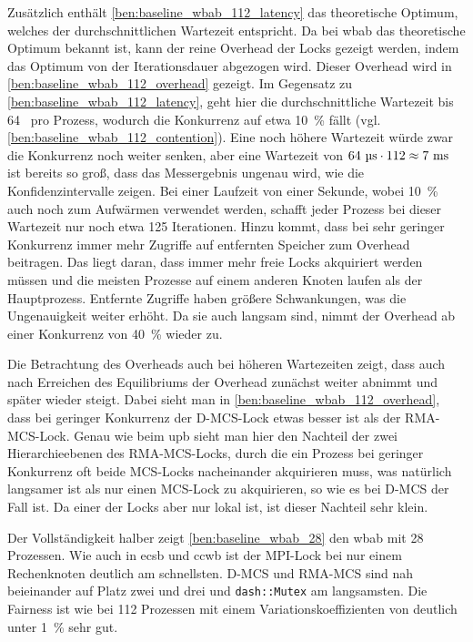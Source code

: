 Zusätzlich enthält \autoref{ben:baseline_wbab_112_latency} das theoretische Optimum,
welches der durchschnittlichen Wartezeit entspricht.
Da bei \gls{wbab} das theoretische Optimum bekannt ist,
kann der reine Overhead der Locks gezeigt werden,
indem das Optimum von der Iterationsdauer abgezogen wird.
Dieser Overhead wird in \autoref{ben:baseline_wbab_112_overhead} gezeigt.
Im Gegensatz zu \autoref{ben:baseline_wbab_112_latency},
geht hier die durchschnittliche Wartezeit bis 64~ pro Prozess,
wodurch die \gls{Konkurrenz} auf etwa 10~\% fällt
(vgl. \autoref{ben:baseline_wbab_112_contention}).
Eine noch höhere Wartezeit würde zwar die \gls{Konkurrenz} noch weiter senken,
aber eine Wartezeit von $64~\text{\textmu{s}} \cdot 112 \approx 7~\text{ms}$ ist bereits so groß,
dass das Messergebnis ungenau wird,
wie die Konfidenzintervalle zeigen.
Bei einer Laufzeit von einer Sekunde,
wobei 10~\% auch noch zum Aufwärmen verwendet werden,
schafft jeder Prozess bei dieser Wartezeit nur noch etwa 125 Iterationen.
Hinzu kommt,
dass bei sehr geringer \gls{Konkurrenz} immer mehr Zugriffe auf entfernten Speicher zum Overhead beitragen.
Das liegt daran,
dass immer mehr freie Locks akquiriert werden müssen
und die meisten Prozesse auf einem anderen Knoten laufen
als der Hauptprozess.
Entfernte Zugriffe haben größere Schwankungen,
was die Ungenauigkeit weiter erhöht.
Da sie auch langsam sind,
nimmt der Overhead ab einer \gls{Konkurrenz} von 40~\% wieder zu.

Die Betrachtung des Overheads auch bei höheren Wartezeiten zeigt,
dass auch nach Erreichen des Equilibriums der Overhead zunächst weiter abnimmt
und später wieder steigt.
Dabei sieht man in \autoref{ben:baseline_wbab_112_overhead},
dass bei geringer \gls{Konkurrenz} der D-MCS-Lock etwas besser ist
als der RMA-MCS-Lock.
Genau wie beim \gls{upb} sieht man hier den Nachteil der zwei Hierarchieebenen des RMA-MCS-Locks,
durch die ein Prozess bei geringer \gls{Konkurrenz} oft beide MCS-Locks nacheinander akquirieren muss,
was natürlich langsamer ist
als nur einen MCS-Lock zu akquirieren,
so wie es bei D-MCS der Fall ist.
Da einer der Locks aber nur lokal ist,
ist dieser Nachteil sehr klein.

Der Vollständigkeit halber zeigt \autoref{ben:baseline_wbab_28} den \gls{wbab} mit 28 Prozessen.
Wie auch in \gls{ecsb} und \gls{ccwb} ist der MPI-Lock bei nur einem Rechenknoten deutlich am schnellsten.
D-MCS und RMA-MCS sind nah beieinander auf Platz zwei und drei
und \texttt{dash::Mutex} am langsamsten.
Die Fairness ist wie bei 112 Prozessen mit einem Variationskoeffizienten von deutlich unter 1~\% sehr gut.

